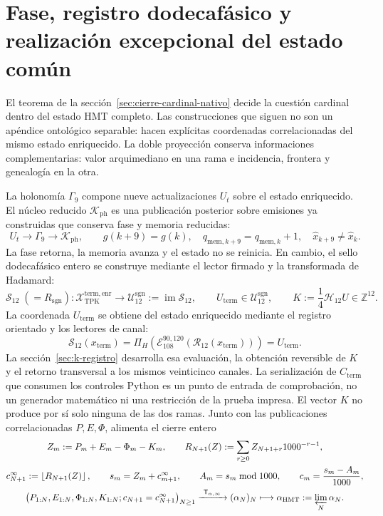 \section{Fase, registro dodecafásico y realización excepcional del estado común}
\label{sec:testigos-descendentes-ch}

El teorema de la sección~\ref{sec:cierre-cardinal-nativo} decide la cuestión
cardinal dentro del estado HMT completo. Las construcciones que siguen no son
un apéndice ontológico separable: hacen explícitas coordenadas correlacionadas
del mismo estado enriquecido. La doble proyección conserva informaciones
complementarias: valor arquimediano en una rama e incidencia, frontera y
genealogía en la otra.

La holonomía \(\Gamma_9\) compone nueve actualizaciones \(U_t\) sobre el estado
enriquecido. El núcleo reducido \(\mathcal K_{\mathrm{ph}}\) es una publicación
posterior sobre emisiones ya construidas que conserva fase y memoria reducidas:
\[
 U_t\longrightarrow\Gamma_9\longrightarrow\mathcal K_{\mathrm{ph}},
 \qquad
 g(k+9)=g(k),\quad
 q_{\mathrm{mem},k+9}=q_{\mathrm{mem},k}+1,\quad
 \widehat x_{k+9}\neq\widehat x_k.
\]
La fase retorna, la memoria avanza y el estado no se reinicia. En cambio, el
sello dodecafásico entero se construye mediante el lector firmado y la
transformada de Hadamard:
\[
 \mathcal S_{12}\;(=R_{\mathrm{sgn}}):
 \mathcal X_{\mathrm{TPK}}^{\mathrm{term,enr}}
 \longrightarrow
 \mathcal U_{12}^{\mathrm{sgn}}:=\operatorname{im}\mathcal S_{12},
 \qquad
 U_{\mathrm{term}}\in\mathcal U_{12}^{\mathrm{sgn}},
 \qquad
 K:=\frac14\mathcal H_{12}U\in\mathbb Z^{12}.
\]
La coordenada \(U_{\mathrm{term}}\) se obtiene del estado enriquecido mediante
el registro orientado y los lectores de canal:
\[
 \mathcal S_{12}(x_{\mathrm{term}})
 =\Pi_H\!\left(
   \mathcal E_{108}^{90,120}
   (\mathcal R_{12}(x_{\mathrm{term}}))\right)
 =U_{\mathrm{term}}.
\]
La sección~\ref{sec:k-registro} desarrolla esa evaluación, la obtención
reversible de \(K\) y el retorno transversal a los mismos veinticinco canales.
La serialización de \(C_{\mathrm{term}}\) que consumen los controles Python es
un punto de entrada de comprobación, no un generador matemático ni una
restricción de la prueba impresa.
El vector \(K\) no produce por sí solo ninguna de las dos ramas. Junto con
las publicaciones correlacionadas \(P,E,\Phi\), alimenta el cierre entero
\[
 \begin{gathered}
 Z_m:=P_m+E_m-\Phi_m-K_m,\qquad
 R_{N+1}(Z):=\sum_{r\geq0}Z_{N+1+r}1000^{-r-1},\\
 c_{N+1}^{\infty}:=\left\lfloor R_{N+1}(Z)\right\rfloor,\qquad
 s_m=Z_m+c_{m+1}^{\infty},\qquad
 A_m=s_m\bmod1000,\qquad
 c_m=\frac{s_m-A_m}{1000},\\
 \bigl(P_{1:N},E_{1:N},\Phi_{1:N},K_{1:N};
       c_{N+1}=c_{N+1}^{\infty}\bigr)_{N\geq1}
 \xrightarrow{\ \mathsf T_{\alpha,\infty}\ }
 (\alpha_N)_N
 \longmapsto
 \alpha_{\mathrm{HMT}}:=\varprojlim_N\alpha_N.
 \end{gathered}
\]
